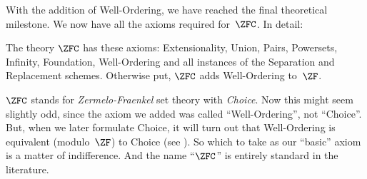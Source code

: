\documentclass[../../../include/open-logic-section]{subfiles}
\begin{document}

With the addition of Well-Ordering, we have reached the final
theoretical milestone. We now have all the axioms required for~$\ZFC$.
In detail:

\begin{defn}
The theory $\ZFC$ has these axioms: Extensionality, Union, Pairs,
Powersets, Infinity, Foundation, Well-Ordering and all instances of
the Separation and Replacement schemes. Otherwise put, $\ZFC$ adds
Well-Ordering to~$\ZF$. 
\end{defn}

$\ZFC$ stands for \emph{Zermelo-Fraenkel} set theory with
\emph{Choice}. Now this might seem slightly odd, since the axiom we
added was called ``Well-Ordering'', not ``Choice''. But, when we later
formulate {Choice}, it will turn out that Well-Ordering is equivalent
(modulo~$\ZF$) to Choice (see ).
So which to take as our ``basic'' axiom is a matter of indifference.
And the name ``$\ZFC$'' is entirely standard in the literature. 
\end{document}
